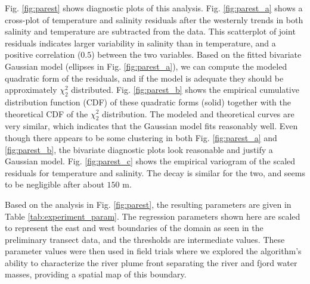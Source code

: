 \documentclass[aoas]{imsart}
\begin{document}
Fig. \ref{fig:parest} shows diagnostic plots of this analysis. Fig. \ref{fig:parest_a} shows a cross-plot of temperature and salinity residuals after the westernly trends in both salinity and temperature are subtracted from the data. This scatterplot of joint residuals indicates larger variability in salinity than in temperature, and a positive correlation ($0.5$) between the two variables. Based on the fitted bivariate Gaussian model (ellipses in Fig. \ref{fig:parest_a}), we can compute the modeled quadratic form of the residuals, and if the model is adequate they should be approximately $\chi^2_2$ distributed. Fig. \ref{fig:parest_b} shows the empirical cumulative distribution function (CDF) of these quadratic forms (solid) together with the theoretical CDF of the $\chi^2_2$ distribution. The modeled and theoretical curves are very similar, which indicates that the Gaussian model fits reasonably well. Even though there appears to be some clustering in both Fig. \ref{fig:parest_a} and \ref{fig:parest_b}, the bivariate diagnostic plots look reasonable and justify a Gaussian model. Fig. \ref{fig:parest_c} shows the empirical variogram of the scaled residuals for temperature and salinity. The decay is similar for the two, and seems to be negligible after about $150$ m. 


Based on the analysis in Fig. \ref{fig:parest}, the resulting parameters are given in Table \ref{tab:experiment_param}. The regression parameters shown here are scaled to represent the east and west boundaries of the domain as seen in the preliminary transect data, and the thresholds are intermediate values. These parameter values were then used in field trials where we explored the algorithm's ability to characterize the river plume front separating the river and fjord water masses, providing a spatial map of this boundary. 

\end{document}
